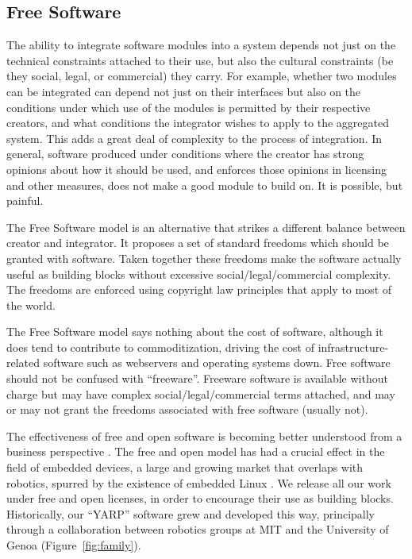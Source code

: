 \subsection{Free Software}

The ability to integrate software modules into a system
depends not just on the technical constraints attached
to their use, but also the cultural constraints
(be they social, legal, or commercial) they carry.
%
For example, whether two modules can be integrated
can depend not just on their interfaces but also on
the conditions under which use of the modules
is permitted by their respective creators,
and what conditions the integrator wishes to 
apply to the aggregated system.  
%
This adds a great deal of complexity to the process
of integration.
%
In general, software produced under conditions where the 
creator has strong opinions about how it should be 
used, and enforces those opinions in licensing
and other measures, does not make a good module 
to build on.
%
It is possible, but painful.

The Free Software model is an alternative that strikes a different
balance between creator and integrator.  It proposes a set of standard
freedoms which should be granted with software. Taken together 
these freedoms make
the software actually useful as building blocks without excessive
social/legal/commercial complexity.  The freedoms are enforced using
copyright law principles that apply to most of the world.

The Free Software model says nothing about the cost of software,
although it does tend to contribute to commoditization, driving the
cost of infrastructure-related software such as webservers and
operating systems down.  Free software should not be confused with
``freeware''.  Freeware software is available without charge but may
have complex social/legal/commercial terms attached, and may
or may not grant the freedoms associated with free software
(usually not).

The effectiveness of free and open software is 
becoming better understood from a business
perspective \cite{vonkrogh2006promise}.
%
The free and open model has had a crucial 
effect in the field of embedded devices,
a large and growing market that overlaps
with robotics, spurred by the existence
of embedded Linux \cite{henkel2006selective}.
%
We release all our work under free and open licenses, in order to
encourage their use as building blocks.  Historically, our ``YARP''
software grew and developed this way, principally through a
collaboration between robotics groups at MIT and the University of
Genoa (Figure~\ref{fig:family}).



